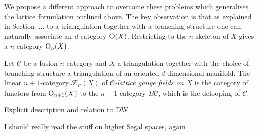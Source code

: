 We propose a different approach to overcome these problems which generalises the
lattice formulation outlined above. The key observation is that as explained in
Section~... to a triangulation together with a branching structure one can naturally associate an $d$-category $\operatorname{O}(X)$. Restricting to the $n$-skeleton
of $X$ gives a $n$-category $\operatorname{O}_n(X)$.
\begin{definition}
Let $\mathcal{C}$ be a fusion $n$-category and $X$ a triangulation together with
the choice of branching structure a triangulation of an oriented $d$-dimensional manifold.
The linear $n+1$-category $\mathcal{F}_\mathcal{C}(X)$ of
\emph{$\mathcal{C}$-lattice gauge fields on $X$} is the category of functors from $\operatorname{O}_{n+1}(X)$ to the $n+1$-category $B\mathcal{C}$, which is the delooping of $\mathcal{C}$.
\end{definition}

\color{red}
Explicit description and relation to DW.

I should really read the stuff on higher Segal spaces, again \color{black}
